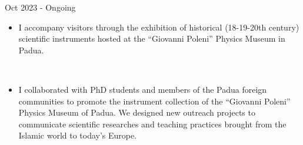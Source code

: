 %
%
%


\begin{experiences}
     {Oct 2023 - Ongoing}%
    {
     \begin{itemize}
         \item I accompany visitors through the exhibition of historical (18-19-20th century) scientific instruments hosted at the ``Giovanni Poleni'' Physics Museum in Padua.
     \end{itemize}}
     \\
    {
     \begin{itemize}
         \item I collaborated with PhD students and members of the Padua foreign communities to promote the instrument collection of the ``Giovanni Poleni'' Physics Museum of Padua. We designed new outreach projects to communicate scientific researches and teaching practices brought from the Islamic world to today's Europe.
     \end{itemize}}


\end{experiences}
